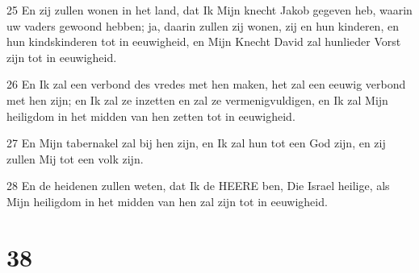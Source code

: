 \par 25 En zij zullen wonen in het land, dat Ik Mijn knecht Jakob gegeven heb, waarin uw vaders gewoond hebben; ja, daarin zullen zij wonen, zij en hun kinderen, en hun kindskinderen tot in eeuwigheid, en Mijn Knecht David zal hunlieder Vorst zijn tot in eeuwigheid.
\par 26 En Ik zal een verbond des vredes met hen maken, het zal een eeuwig verbond met hen zijn; en Ik zal ze inzetten en zal ze vermenigvuldigen, en Ik zal Mijn heiligdom in het midden van hen zetten tot in eeuwigheid.
\par 27 En Mijn tabernakel zal bij hen zijn, en Ik zal hun tot een God zijn, en zij zullen Mij tot een volk zijn.
\par 28 En de heidenen zullen weten, dat Ik de HEERE ben, Die Israel heilige, als Mijn heiligdom in het midden van hen zal zijn tot in eeuwigheid.

\chapter{38}

